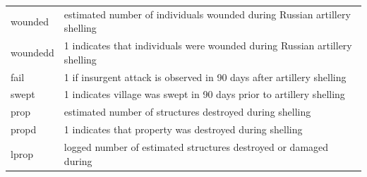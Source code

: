 \documentclass[]{article}
\theoremstyle{definition}
\theoremstyle{definition}
\theoremstyle{definition}
\theoremstyle{remark}
\begin{document}
\begin{longtable}[]{@{}ll@{}}
\begin{minipage}[t]{0.12\columnwidth}
wounded\strut
\end{minipage} & \begin{minipage}[t]{0.50\columnwidth}\raggedright\strut
estimated number of individuals wounded during Russian artillery
shelling\strut
\end{minipage}\tabularnewline
\begin{minipage}[t]{0.12\columnwidth}\raggedright\strut
woundedd\strut
\end{minipage} & \begin{minipage}[t]{0.50\columnwidth}\raggedright\strut
1 indicates that individuals were wounded during Russian artillery
shelling\strut
\end{minipage}\tabularnewline
\begin{minipage}[t]{0.12\columnwidth}\raggedright\strut
fail\strut
\end{minipage} & \begin{minipage}[t]{0.50\columnwidth}\raggedright\strut
1 if insurgent attack is observed in 90 days after artillery
shelling\strut
\end{minipage}\tabularnewline
\begin{minipage}[t]{0.12\columnwidth}\raggedright\strut
swept\strut
\end{minipage} & \begin{minipage}[t]{0.50\columnwidth}\raggedright\strut
1 indicates village was swept in 90 days prior to artillery
shelling\strut
\end{minipage}\tabularnewline
\begin{minipage}[t]{0.12\columnwidth}\raggedright\strut
prop\strut
\end{minipage} & \begin{minipage}[t]{0.50\columnwidth}\raggedright\strut
estimated number of structures destroyed during shelling\strut
\end{minipage}\tabularnewline
\begin{minipage}[t]{0.12\columnwidth}\raggedright\strut
propd\strut
\end{minipage} & \begin{minipage}[t]{0.50\columnwidth}\raggedright\strut
1 indicates that property was destroyed during shelling\strut
\end{minipage}\tabularnewline
\begin{minipage}[t]{0.12\columnwidth}\raggedright\strut
lprop\strut
\end{minipage} & \begin{minipage}[t]{0.50\columnwidth}\raggedright\strut
logged number of estimated structures destroyed or damaged during

\end{minipage}
\end{longtable}
\end{document}
